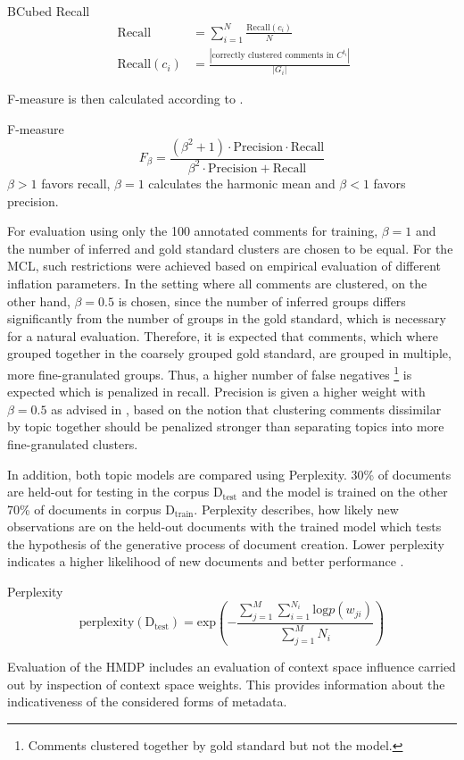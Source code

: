 \begin{definition}{BCubed Recall}
\begin{align}
\text{   Recall} &= \sum_{i=1}^N \frac{\text{Recall}(c_i)}{N} \\
\text{   Recall}(c_i) &= \frac{|\text{correctly clustered comments in }C^{t_i}|}{|G_i|}
\end{align}
\end{definition}
F-measure is then calculated according to \cite{Chinchor:1992:MEM:1072064.1072067}.
\begin{definition}{F-measure}
\begin{equation}
F_\beta = \frac{(\beta^2 + 1) \cdot \text{Precision} \cdot \text{Recall}}{\beta^2 \cdot \text{Precision} +\text{Recall}}
\end{equation}
$\beta > 1$ favors recall, $\beta = 1$ calculates the harmonic mean and $\beta < 1$ favors precision.
\end{definition}
For evaluation using only the 100 annotated comments for training, $\beta = 1$ and the number of inferred and gold standard clusters are chosen to be equal. For the MCL, such restrictions were achieved based on empirical evaluation of different inflation parameters. In the setting where all comments are clustered, on the other hand, $\beta = 0.5$ is chosen, since the number of inferred groups differs significantly from the number of groups in the gold standard, which is necessary for a natural evaluation. Therefore, it is expected that comments, which where grouped together in the coarsely grouped gold standard, are grouped in multiple, more fine-granulated groups. Thus, a higher number of false negatives \footnote{Comments clustered together by gold standard but not the model.} is expected which is penalized in recall. Precision is given a higher weight with $\beta = 0.5$ as advised in \cite{Chinchor:1992:MEM:1072064.1072067}, based on the notion that clustering comments dissimilar by topic together should be penalized stronger than separating topics into more fine-granulated clusters. \par
In addition, both topic models are compared using Perplexity. 30\% of documents are held-out for testing in the corpus D$_{\text{test}}$ and the model is trained on the other 70\% of documents in corpus D$_{\text{train}}$. Perplexity describes, how likely new observations are on the held-out documents with the trained model which tests the hypothesis of the generative process of document creation. Lower perplexity indicates a higher likelihood of new documents and better performance \cite{DBLP:phd/dnb/Kling16}.
\begin{definition}{Perplexity}
\begin{equation}
\text{perplexity}(\text{D}_{\text{test}}) = \text{exp}\left(-\frac{\sum_{j=1}^M\sum_{i=1}^{N_i}\text{log}p(w_{ji})}{\sum_{j=1}^MN_i}\right)
\end{equation}
\end{definition}
Evaluation of the HMDP includes an evaluation of context space influence carried out by inspection of context space weights. This provides information about the indicativeness of the considered forms of metadata.
